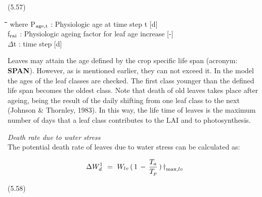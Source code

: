  
\strut\hfill (5.57)
\nwln
\begin{tabbing}
\hspace{1.27cm}\=\hspace{1.27cm}\=\hspace{1.27cm}\=\hspace{1.27cm}\=%
\hspace{1.27cm}\=\hspace{1.27cm}\=\hspace{1.27cm}\=\hspace{1.27cm}\=%
\hspace{1.27cm}\=\hspace{1.27cm}\=\kill
where P$_{{\rm age,t}}$ : Physiologic age at time step t        [d]\\
f$_{{\rm rai}}$ : Physiologic ageing factor for leaf age increase        [-]\\
$\Delta$t : time step        [d]
\end{tabbing}

 
Leaves may attain the age defined by the crop specific life span (acronym: {\bf SPAN}).
However, as is men\-tioned earlier, they can not exceed it. In the model the ages of the
leaf classes are checked. The first class younger than the defined life span becomes the
oldest class. Note that death of old leaves takes place after ageing, being the result of the
daily shifting from one leaf class to the next (Johnson \& Thornley, 1983). In this way,
the life time of leaves is the maximum number of days that a leaf class contributes to the
LAI and to photosyn\-the\-sis.



{\it Death rate due to water stress\/}\\
The potential death rate of leaves due to water stress can be calculated as:

\begin{displaymath}
\Delta W _{d}^{1} ~=~ W _{lv} \, (\, 1\, -\,{\frac{T _{a} }{T _{p} }} \, )\, {\rm \dag } _{\max ,lv} 
\end{displaymath}

 
\strut\hfill (5.58)

